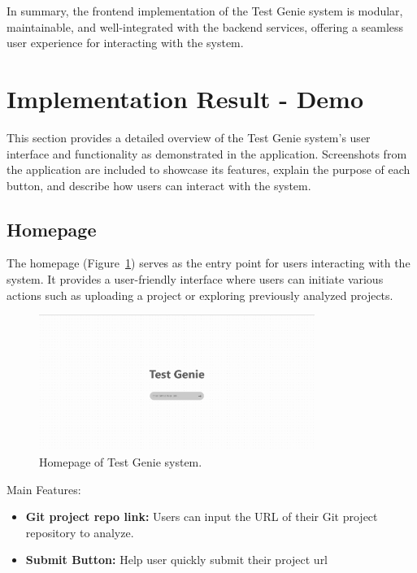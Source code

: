 In summary, the frontend implementation of the Test Genie system is modular, maintainable, and well-integrated with the backend services, offering a seamless user experience for interacting with the system.

\section{Implementation Result - Demo}

This section provides a detailed overview of the Test Genie system's user interface and functionality as demonstrated in the application. Screenshots from the application are included to showcase its features, explain the purpose of each button, and describe how users can interact with the system.

\subsection{Homepage}

The homepage (Figure~\ref{fig:homepage}) serves as the entry point for users interacting with the system. It provides a user-friendly interface where users can initiate various actions such as uploading a project or exploring previously analyzed projects.

\begin{figure}[H]
    \centering
    \includegraphics[width=0.8\textwidth]{images/homepage.png}
    \caption{Homepage of Test Genie system.}
    \label{fig:homepage}
\end{figure}

Main Features:
\begin{itemize}
    \item \textbf{Git project repo link:} Users can input the URL of their Git project repository to analyze.
    \item \textbf{Submit Button:} Help user quickly submit their project url
\end{itemize}

